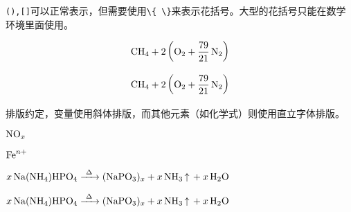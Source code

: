 
\begin{codeshow}
\par
{}\par
{}\par
{}
\end{codeshow}


\verb|(),[]|可以正常表示，但需要使用\verb|\{ \}|来表示花括号。大型的花括号只能在数学环境里面使用。

\begin{codeshow}
\par
{}
\end{codeshow}

\begin{latex}
\[\ce{CH4 + 2 $\left( \ce{O2 + 79/21 N2} \right)$}\]
\end{latex}

\[\ce{CH4 + 2 $\left( \ce{O2 + 79/21 N2} \right)$}\]


\begin{codeshow}
\par
{}\par
{}
\end{codeshow}


\begin{codeshow}
\par
{}
\end{codeshow}

排版约定，变量使用斜体排版，而其他元素（如化学式）则使用直立字体排版。

\begin{codeshow}
$\ce{NO_x}$\par
$\ce{Fe^n+}$
\end{codeshow}

\begin{latex}
$\ce{x Na(NH4)HPO4 ->[\Delta] (NaPO3)_x + x NH3 ^ + x H2O}$
\end{latex}

\begin{center}
	$\ce{x Na(NH4)HPO4 ->[\Delta] (NaPO3)_x + x NH3 ^ + x H2O}$
\end{center}

\begin{codeshow}
\par
\ce{[Pt(\eta^2-C2H4)Cl3]-}
\end{codeshow}

